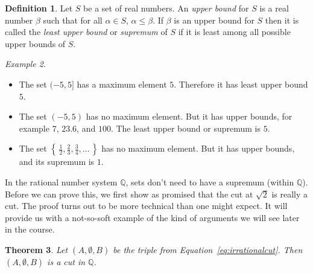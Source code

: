 \documentclass[11pt,oneside]{amsbook}
\newcommand{\set}[1]{\left\{\,#1\,\right\}}
\newcommand{\Q}{\mathbb Q}
\newcommand{\R}{\mathbb R}
\theoremstyle{definition}
\theoremstyle{plain}
\newtheorem{theorem}{Theorem}[section]
\theoremstyle{definition}
\newtheorem{definition}[theorem]{Definition}
\theoremstyle{remark}
\newtheorem{example}[theorem]{Example}
\numberwithin{equation}{section}
\numberwithin{figure}{section}
\begin{document}
\begin{definition}
  Let $S$ be a set of real numbers. An \emph{upper bound} for $S$ is a real number $\beta$ such that for all $\alpha\in S$, $\alpha\leq\beta$. If $\beta$ is an upper bound for $S$ then it is called the \emph{least upper bound} or \emph{supremum} of $S$ if it is least among all possible upper bounds of $S$.
\end{definition}

\begin{example}
  \begin{itemize}
  \item The set $(-5,5]$ has a maximum element $5$. Therefore it has least upper bound $5$.
  \item The set $(-5,5)$ has no maximum element. But it has upper bounds, for example $7$, $23.6$, and $100$. The least upper bound or supremum is $5$.
  \item The set $\set{\frac12,\frac23,\frac34,\ldots}$ has no maximum element. But it has upper bounds, and its supremum is $1$.
  \end{itemize}
\end{example}


In the rational number system $\Q$, sets don't need to have a supremum (within $\Q$). Before we can prove this, we first show as promised that the cut at $\sqrt2$ is really a cut. The proof turns out to be more technical than one might expect. It will provide us with a not-so-soft example of the kind of arguments we will see later in the course.

\begin{theorem}
  \label{thm:root-2-cut}
  Let $(A,\emptyset,B)$ be the triple from Equation~\ref{eq:irrationalcut}. Then $(A,\emptyset,B)$ is a cut in $\Q$.
\end{theorem}
\end{document}
